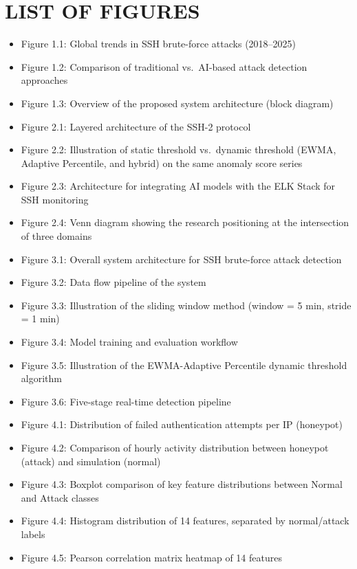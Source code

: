 \documentclass[
  a4paper]{report}
\providecommand{\tightlist}{%
  \setlength{\itemsep}{0pt}\setlength{\parskip}{0pt}}
\begin{document}
\section{LIST OF FIGURES}\label{list-of-figures}

\begin{itemize}
\tightlist
\item
  Figure 1.1: Global trends in SSH brute-force attacks (2018--2025)
\item
  Figure 1.2: Comparison of traditional vs.~AI-based attack detection
  approaches
\item
  Figure 1.3: Overview of the proposed system architecture (block
  diagram)
\item
  Figure 2.1: Layered architecture of the SSH-2 protocol
\item
  Figure 2.2: Illustration of static threshold vs.~dynamic threshold
  (EWMA, Adaptive Percentile, and hybrid) on the same anomaly score
  series
\item
  Figure 2.3: Architecture for integrating AI models with the ELK Stack
  for SSH monitoring
\item
  Figure 2.4: Venn diagram showing the research positioning at the
  intersection of three domains
\item
  Figure 3.1: Overall system architecture for SSH brute-force attack
  detection
\item
  Figure 3.2: Data flow pipeline of the system
\item
  Figure 3.3: Illustration of the sliding window method (window = 5 min,
  stride = 1 min)
\item
  Figure 3.4: Model training and evaluation workflow
\item
  Figure 3.5: Illustration of the EWMA-Adaptive Percentile dynamic
  threshold algorithm
\item
  Figure 3.6: Five-stage real-time detection pipeline
\item
  Figure 4.1: Distribution of failed authentication attempts per IP
  (honeypot)
\item
  Figure 4.2: Comparison of hourly activity distribution between
  honeypot (attack) and simulation (normal)
\item
  Figure 4.3: Boxplot comparison of key feature distributions between
  Normal and Attack classes
\item
  Figure 4.4: Histogram distribution of 14 features, separated by
  normal/attack labels
\item
  Figure 4.5: Pearson correlation matrix heatmap of 14 features

\end{itemize}
\end{document}
